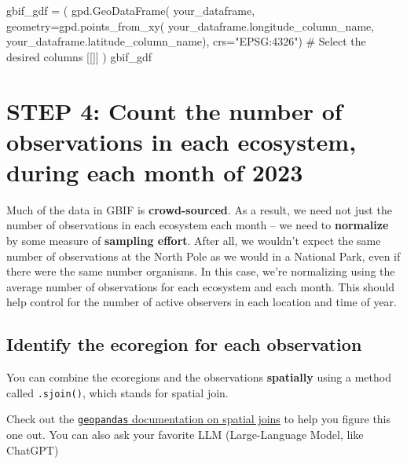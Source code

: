 \documentclass[
  letterpaper,
  DIV=11,
  numbers=noendperiod,
  oneside]{scrreprt}
\newenvironment{Shaded}{\begin{snugshade}}{\end{snugshade}}
\newcommand{\CommentTok}[1]{\textcolor[rgb]{0.37,0.37,0.37}{#1}}
\newcommand{\NormalTok}[1]{\textcolor[rgb]{0.00,0.23,0.31}{#1}}
\newcommand{\OperatorTok}[1]{\textcolor[rgb]{0.37,0.37,0.37}{#1}}
\newcommand{\StringTok}[1]{\textcolor[rgb]{0.13,0.47,0.30}{#1}}
\begin{document}
\begin{Shaded}
\begin{Highlighting}[]
\NormalTok{gbif\_gdf }\OperatorTok{=}\NormalTok{ (}
\NormalTok{    gpd.GeoDataFrame(}
\NormalTok{        your\_dataframe, }
\NormalTok{        geometry}\OperatorTok{=}\NormalTok{gpd.points\_from\_xy(}
\NormalTok{            your\_dataframe.longitude\_column\_name, }
\NormalTok{            your\_dataframe.latitude\_column\_name), }
\NormalTok{        crs}\OperatorTok{=}\StringTok{"EPSG:4326"}\NormalTok{)}
    \CommentTok{\# Select the desired columns}
\NormalTok{    [[]]}
\NormalTok{)}
\NormalTok{gbif\_gdf}
\end{Highlighting}
\end{Shaded}

\section{STEP 4: Count the number of observations in each ecosystem,
during each month of
2023}\label{step-4-count-the-number-of-observations-in-each-ecosystem-during-each-month-of-2023}

Much of the data in GBIF is \textbf{crowd-sourced}. As a result, we need
not just the number of observations in each ecosystem each month -- we
need to \textbf{normalize} by some measure of \textbf{sampling effort}.
After all, we wouldn't expect the same number of observations at the
North Pole as we would in a National Park, even if there were the same
number organisms. In this case, we're normalizing using the average
number of observations for each ecosystem and each month. This should
help control for the number of active observers in each location and
time of year.

\subsection{Identify the ecoregion for each
observation}\label{identify-the-ecoregion-for-each-observation}

You can combine the ecoregions and the observations \textbf{spatially}
using a method called \texttt{.sjoin()}, which stands for spatial join.

\begin{tcolorbox}[enhanced jigsaw, colbacktitle=quarto-callout-color!10!white, opacityback=0, bottomtitle=1mm, toptitle=1mm, bottomrule=.15mm, left=2mm, colframe=quarto-callout-color-frame, leftrule=.75mm, opacitybacktitle=0.6, colback=white, rightrule=.15mm, toprule=.15mm, breakable, titlerule=0mm, title=\textcolor{quarto-callout-color}{\faInfo}\hspace{0.5em}{Read More}, coltitle=black, arc=.35mm]

Check out the
\href{https://geopandas.org/en/stable/docs/user_guide/mergingdata.html\#spatial-joins}{\texttt{geopandas}
documentation on spatial joins} to help you figure this one out. You can
also ask your favorite LLM (Large-Language Model, like ChatGPT)

\end{tcolorbox}
\end{document}

